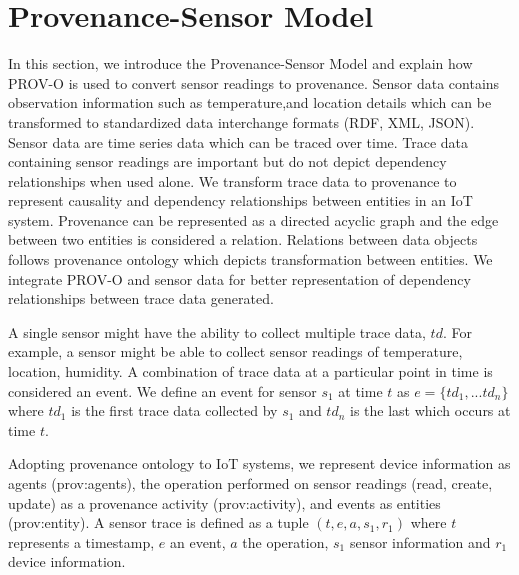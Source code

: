 \documentclass[conference]{IEEEtran}
\begin{document}



%



\section {Provenance-Sensor Model}
In this section, we introduce the Provenance-Sensor Model and explain how PROV-O is used to convert sensor readings to provenance. Sensor data contains observation information such as temperature,and location details which can be transformed to standardized data interchange formats (RDF, XML, JSON). Sensor data are time series data which can be traced over time. Trace data containing sensor readings are important but do not depict dependency relationships when used alone. We transform trace data to provenance to represent causality and dependency relationships between entities in an IoT system. Provenance can be represented as a directed acyclic graph and the edge between two entities is considered a relation. Relations between data objects follows provenance ontology which depicts transformation between entities. We integrate PROV-O and sensor data for better representation of dependency relationships between trace data generated.

\par A single sensor might have the ability to collect multiple trace data, $td$. For example, a sensor might be able to collect sensor readings of temperature, location, humidity. A combination of trace data at a particular point in time is considered an event. We define an event  for sensor $s_1$ at time $t$ as $e= \{td_1, ...td_n\} $ where $td_1$ is the first trace data collected by $s_1$  and $td_n$ is the last which occurs at time $t$.





\par Adopting provenance ontology to IoT systems, we represent device information as agents (prov:agents), the operation performed on sensor readings (read, create, update) as a provenance activity (prov:activity), and events as entities (prov:entity). A sensor trace is defined as a tuple  $ (t, e, a, s_1, r_1)$ where $t$ represents a timestamp, $e$ an event, $a$ the operation, $s_1$ sensor information and $r_1$ device information.  
\end{document}
